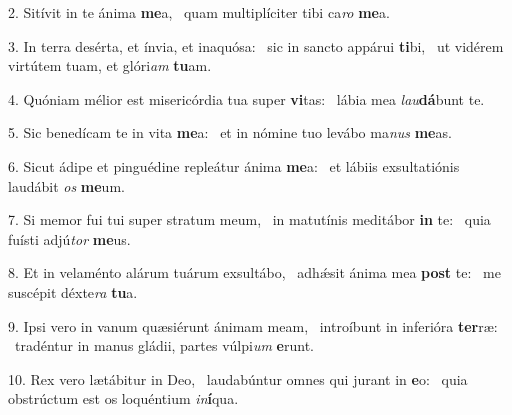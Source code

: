 2. Sitívit in te ánima \textbf{me}a, \ast\  quam multiplíciter tibi ca\textit{ro} \textbf{me}a.\

3. In terra desérta, et ínvia, et inaquósa: \dag\  sic in sancto appárui \textbf{ti}bi, \ast\  ut vidérem virtútem tuam, et glóri\textit{am} \textbf{tu}am.\

4. Quóniam mélior est misericórdia tua super \textbf{vi}tas: \ast\  lábia mea \textit{lau}\textbf{dá}bunt te.\

5. Sic benedícam te in vita \textbf{me}a: \ast\  et in nómine tuo levábo ma\textit{nus} \textbf{me}as.\

6. Sicut ádipe et pinguédine repleátur ánima \textbf{me}a: \ast\  et lábiis exsultatiónis laudábit \textit{os} \textbf{me}um.\

7. Si memor fui tui super stratum meum, \dag\  in matutínis meditábor \textbf{in} te: \ast\  quia fuísti adjú\textit{tor} \textbf{me}us.\

8. Et in velaménto alárum tuárum exsultábo, \dag\  adhǽsit ánima mea \textbf{post} te: \ast\  me suscépit déxte\textit{ra} \textbf{tu}a.\

9. Ipsi vero in vanum quæsiérunt ánimam meam, \dag\  introíbunt in inferióra \textbf{ter}ræ: \ast\  tradéntur in manus gládii, partes vúlpi\textit{um} \textbf{e}runt.\

10. Rex vero lætábitur in Deo, \dag\  laudabúntur omnes qui jurant in \textbf{e}o: \ast\  quia obstrúctum est os loquéntium \textit{in}\textbf{í}qua.\

